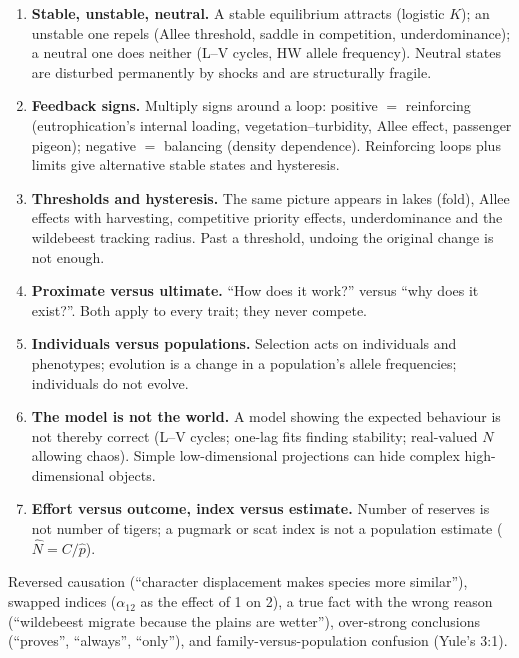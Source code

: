 \begin{enumerate}
\item \textbf{Stable, unstable, neutral.} A stable equilibrium attracts (logistic $K$); an unstable one repels (Allee
threshold, saddle in competition, underdominance); a neutral one does neither (L--V cycles, HW allele frequency). Neutral
states are disturbed permanently by shocks and are structurally fragile.

\item \textbf{Feedback signs.} Multiply signs around a loop: positive $=$ reinforcing (eutrophication's internal loading,
vegetation--turbidity, Allee effect, passenger pigeon); negative $=$ balancing (density dependence). Reinforcing loops plus
limits give alternative stable states and hysteresis.

\item \textbf{Thresholds and hysteresis.} The same picture appears in lakes (fold), Allee effects with harvesting,
competitive priority effects, underdominance and the wildebeest tracking radius. Past a threshold, undoing the original
change is not enough.

\item \textbf{Proximate versus ultimate.} ``How does it work?'' versus ``why does it exist?''. Both apply to every trait;
they never compete.

\item \textbf{Individuals versus populations.} Selection acts on individuals and phenotypes; evolution is a change in a
population's allele frequencies; individuals do not evolve.

\item \textbf{The model is not the world.} A model showing the expected behaviour is not thereby correct (L--V cycles; one-lag
fits finding stability; real-valued $N$ allowing chaos). Simple low-dimensional projections can hide complex
high-dimensional objects.

\item \textbf{Effort versus outcome, index versus estimate.} Number of reserves is not number of tigers; a pugmark or scat index
is not a population estimate ($\hat N=C/\hat p$).
\end{enumerate}

\begin{trap}
Reversed causation (``character displacement makes species more similar''), swapped indices ($\alpha_{12}$ as the effect
of 1 on 2), a true fact with the wrong reason (``wildebeest migrate because the plains are wetter''), over-strong
conclusions (``proves'', ``always'', ``only''), and family-versus-population confusion (Yule's 3:1).
\end{trap}

